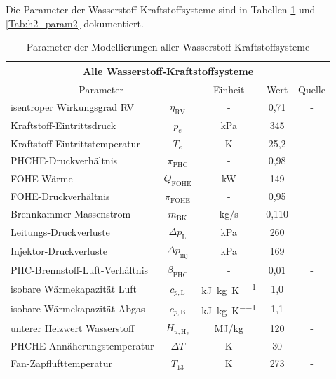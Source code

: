 Die Parameter der Wasserstoff-Kraftstoffsysteme sind in Tabellen \ref{Tab:h2_parametrisiert} und \ref{Tab:h2_param2} dokumentiert.

\begin{table}[ht]
    \centering
	\caption{Parameter der Modellierungen aller Wasserstoff-Kraftstoffsysteme}
	\begin{tabular} {|l|c|c|c|c|} \hline%
    \multicolumn{5}{|c}{Alle Wasserstoff-Kraftstoffsysteme}\\ \hline
    \multicolumn{2}{|c|}{Parameter} & Einheit & Wert & Quelle\\ \hline\hline%
    isentroper Wirkungsgrad RV & $\eta_\mathrm{RV}$ & - & 0,71 & - \\ \hline
    Kraftstoff-Eintrittsdruck & $p_e$ & kPa & 345 & \cite{Brewer.1991, Scholz.2003} \\ \hline
    Kraftstoff-Eintrittstemperatur & $T_e$ & K & 25,2 & \cite{Brewer.1991, Scholz.2003} \\ \hline
    PHCHE-Druckverhältnis  & $\pi_\mathrm{PHC}$ & - & 0,98 & \cite{Sciatti.2025} \\ \hline
    FOHE-Wärme & $\dot{Q}_\mathrm{FOHE}$ & kW & 149 & - \\ \hline
    FOHE-Druckverhältnis & $\pi_\mathrm{FOHE}$ & - & 0,95 & \cite{Brewer.1991} \\ \hline
    Brennkammer-Massenstrom & $\dot{m}_{\mathrm{BK}}$ & kg/s & 0,110 & - \\ \hline
    Leitungs-Druckverluste & $\Delta p_\mathrm{L}$ & kPa & 260 & \cite{Brewer.1991} \\ \hline
    Injektor-Druckverluste & $\Delta p_\mathrm{inj}$ & kPa & 169 & \cite{Brewer.1991} \\ \hline
    PHC-Brennstoff-Luft-Verhältnis & $\beta_\mathrm{PHC}$ & - & 0,01 & - \\ \hline
    isobare Wärmekapazität Luft & $c_{p, \mathrm{L}}$ & \si{\kilo\J\per\kg\per\K} & 1,0 & \cite{Leader.} \\ \hline
    isobare Wärmekapazität Abgas & $c_{p, \mathrm{B}}$ & \si{\kilo\J\per\kg\per\K} & 1,1 & \cite{Leader.} \\ \hline
    unterer Heizwert Wasserstoff & $H_{u, \mathrm{H}_2}$ & MJ/kg & 120 & - \\ \hline
    PHCHE-Annäherungstemperatur & $\Delta T$ & K & 30 & - \\ \hline
    Fan-Zapflufttemperatur & $T_{13}$ & K & 273 & - \\ \hline
   
    \end{tabular}	
    \label{Tab:h2_parametrisiert}%
\end{table}
\FloatBarrier 

